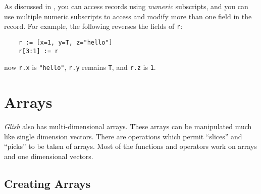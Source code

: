 As discussed in , you
can access records using {\em numeric} subscripts, and you can use multiple
numeric subscripts to access and modify more than one field in the record.
For example, the following reverses the fields of {\tt r}:
\begin{verbatim}
    r := [x=1, y=T, z="hello"]
    r[3:1] := r
\end{verbatim}
now {\tt r.x} is {\tt "hello"}, {\tt r.y} remains {\tt T},
and {\tt r.z} is {\tt 1}.

\section{Arrays}
\label{arrays}

{\em Glish} also has multi-dimensional arrays. These arrays
can be manipulated much like single dimension vectors. There are operations
which permit ``slices'' and ``picks'' to be taken of arrays.  Most
of the functions and operators work on arrays and one dimensional
vectors.

\subsection{Creating Arrays}
\label{creating-arrays}

